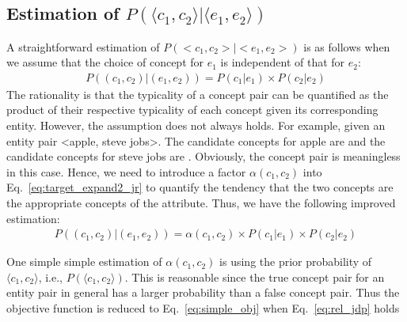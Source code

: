 \subsection{Estimation of $P(\langle c_1,c_2\rangle | \langle e_1,e_2\rangle)$ }
A straightforward estimation of $P(<c_{1},c_{2}>|<e_{1},e_{2}>)$ is as follows when we assume that the choice of concept for $e_1$ is independent of that for $e_2$:
\begin{equation}
\label{eq:target_expand2_naive}
\begin{split}
P((c_{1},c_{2})|(e_{1},e_{2})) = P(c_1|e_1) \times P(c_2|e_2)
\end{split}
\end{equation} The rationality is that the typicality of a concept pair can be quantified as the product of their respective typicality of each concept given its corresponding entity.
However, the assumption does not always holds. For example, given an entity pair \ac{<apple, steve jobs>}. The candidate concepts for \ac{apple} are  and the candidate concepts for \ac{steve jobs} are . Obviously, the concept pair  is meaningless in this case. Hence, we need to introduce a factor $\alpha(c_1,c_2)$ into Eq.~\ref{eq:target_expand2_jr} to quantify the tendency that the two concepts are the appropriate concepts of the attribute. Thus, we have the following improved estimation:
\begin{equation}
\label{eq:target_expand2_jr}
\begin{split}
P((c_{1},c_{2})|(e_{1},e_{2})) = \alpha(c_1,c_2) \times P(c_1|e_1) \times P(c_2|e_2)
\end{split}
\end{equation}


One simple simple estimation of $\alpha(c_1,c_2)$ is using the prior probability of $\langle c_1, c_2\rangle$, i.e., $P(\langle c_1,c_2\rangle)$. This is reasonable since the true concept pair for an entity pair in general has a larger probability than 
a false concept pair. 
Thus the objective function is reduced to Eq.~\ref{eq:simple_obj} when Eq.~\ref{eq:rel_jdp} holds



